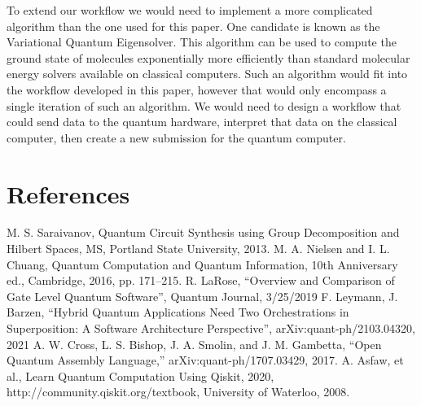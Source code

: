 \documentclass{article}
\begin{document}
To extend our workflow we would need to implement a more complicated algorithm than the one used for this paper. One candidate is known as the Variational Quantum Eigensolver. This algorithm can be used to compute the ground state of molecules exponentially more efficiently than standard molecular energy solvers available on classical computers. Such an algorithm would fit into the workflow developed in this paper, however that would only encompass a single iteration of such an algorithm. We would need to design a workflow that could send data to the quantum hardware, interpret that data on the classical computer, then create a new submission for the quantum computer.
\newpage
\section{References}
\begin{thebibliography}{00}
    \makeatletter
    \makeatother
     M. S. Saraivanov, Quantum Circuit Synthesis using Group Decomposition and Hilbert Spaces, MS, Portland State University, 2013.
     M. A. Nielsen and I. L. Chuang, Quantum Computation and Quantum Information, 10th Anniversary ed., Cambridge, 2016, pp. 171--215.
     R. LaRose, ``Overview and Comparison of Gate Level Quantum Software'', Quantum Journal, 3/25/2019
     F. Leymann, J. Barzen, ``Hybrid Quantum Applications Need Two Orchestrations in Superposition: A Software Architecture Perspective'', arXiv:quant-ph/2103.04320, 2021
     A. W. Cross, L. S. Bishop, J. A. Smolin, and J. M. Gambetta, ``Open Quantum Assembly Language,'' arXiv:quant-ph/1707.03429, 2017.      
     A. Asfaw, et al., Learn Quantum Computation Using Qiskit, 2020, {http://community.qiskit.org/textbook}, University of Waterloo, 2008.
\end{thebibliography}
\end{document}

